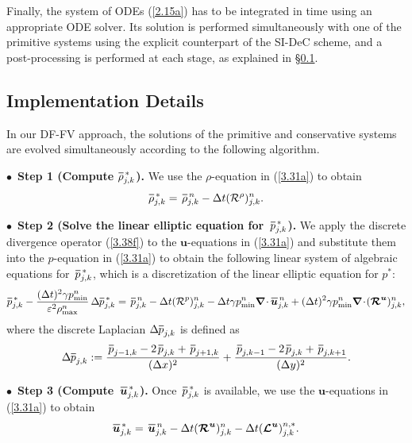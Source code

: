 \documentclass[preprint,12pt]{elsarticle}
\def\bnabla{\bm{\nabla}}
\newcommand{\dt}{\Delta t}
\newcommand{\dx}{\Delta x}
\newcommand{\dy}{\Delta y}
\newcommand{\ve}{\varepsilon}
\newcommand\eref[1]{(\ref{#1})}
\newcommand*\xbar[1]{%
	\hbox{%
		\vbox{%
			\hrule height 0.5pt %
			\kern0.4ex%
			\hbox{%
				\kern-0.05em%
				\ensuremath{#1}%
				\kern-0.00em%
			}%
		}%
	}%
}
\begin{document}
Finally, the system of ODEs \eref{2.15a} has to be integrated in time using an appropriate ODE solver. Its solution is performed
simultaneously with one of the primitive systems using the explicit counterpart of the SI-DeC scheme, and a post-processing is performed
at each stage, as explained in \S\ref{sec422}.

\subsection{Implementation Details}\label{sec422}
In our DF-FV approach, the solutions of the primitive and conservative systems are evolved simultaneously according to the following
algorithm.

\smallskip
\noindent
$\bullet\,$ \textbf{Step 1 (Compute $\xbar\rho^{\,*}_{j,k}$).} We use the $\rho$-equation in \eref{3.31a} to obtain
\begin{equation*}
	\xbar\rho^{\,*}_{j,k}=\,\xbar\rho^{\,n}_{j,k}-\dt({\cal R}^\rho)^n_{j,k}.
\end{equation*}

\smallskip
\noindent
$\bullet\,$ \textbf{Step 2 (Solve the linear elliptic equation for $\,\xbar p^{\,*}_{j,k}$).} We apply the discrete divergence operator
\eref{3.38f} to the $\bm u$-equations  in \eref{3.31a} and substitute them into the $p$-equation in \eref{3.31a} to obtain the following
linear system of algebraic equations for $\,\xbar p^{\,*}_{j,k}$, which is a discretization of the linear elliptic equation for $p^*$:
\begin{equation*}
	\xbar p^{\,*}_{j,k}-\frac{(\dt)^2\gamma p_{\min}^n}{\ve^2\rho_{\max}^n}\,\Delta\xbar p_{j,k}^{\,*}=\,\xbar p^{\,n}_{j,k}-
	\dt({\cal R}^p)^n_{j,k}-\dt\gamma p_{\min}^n\bnabla\!\cdot\xbar{\bm u}_{j,k}^{\,n}
	+(\dt)^2\gamma p_{\min}^n\bnabla\!\cdot\!(\bm{{\cal R}}^{\bm u})^n_{j,k},
	\label{3.39f}
\end{equation*}
where the discrete Laplacian $\Delta\xbar p_{j,k}$ is defined as
$$
\Delta\xbar p_{j,k}:=\frac{\,\xbar p_{j-1,k}-2\,\xbar p_{j,k}+\,\xbar p_{j+1,k}}{(\dx)^2}+
\frac{\,\xbar p_{j,k-1}-2\,\xbar p_{j,k}+\,\xbar p_{j,k+1}}{(\dy)^2}.
$$

\smallskip
\noindent
$\bullet\,$ \textbf{Step 3 (Compute $\,\xbar{\bm u}^{\,*}_{j,k}$).} Once $\,\xbar p^{\,*}_{j,k}$ is available, we use the $\bm u$-equations
in \eref{3.31a} to obtain
\begin{equation*}
	\xbar{\bm u}^{\,*}_{j,k}=\,\xbar{\bm u}^{\,n}_{j,k}-\dt(\bm{{\cal R}}^{\bm u})^n_{j,k}-\dt(\bm{{\cal L}}^{\bm u})^{n,*}_{j,k}.
\end{equation*}
\end{document}
